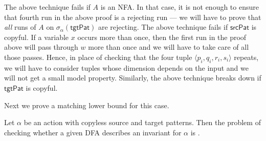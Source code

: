 \documentclass[12pt, a4paper]{article}
\newcommand{\A}{\aut}
\newcommand{\ssub}{\sigma} %
\newcommand{\spat}{\textsf{srcPat}}
\newcommand{\tpat}{\textsf{tgtPat}}
\renewcommand{\aut}{A}
\begin{document}
The above technique fails if $\A$ is an NFA. In that case, it is not enough to ensure that fourth run in the above proof is a rejecting
run --- we will have to prove that \emph{all} runs of $A$ on $\ssub_\alpha(\tpat)$ are rejecting. The above technique fails if $\spat$
is copyful. If a variable $x$ occurs more than once, then the first run in the proof above will pass through $w$ more than once and we
will have to take care of all those passes. Hence, in place of checking that the four tuple $\langle p_i, q_i, r_i, s_i\rangle$ repeats,
we will have to consider tuples whose dimension depends on the input and we will not get a small model property. Similarly, the above
technique breaks down if $\tpat$ is copyful.

Next we prove a matching lower bound for this case.
\begin{lemma}
	Let $\alpha$ be an action with copyless source and target patterns. Then the problem of checking whether a given DFA describes an
	invariant for $\alpha$ is \conph.
\end{lemma}
\end{document}
